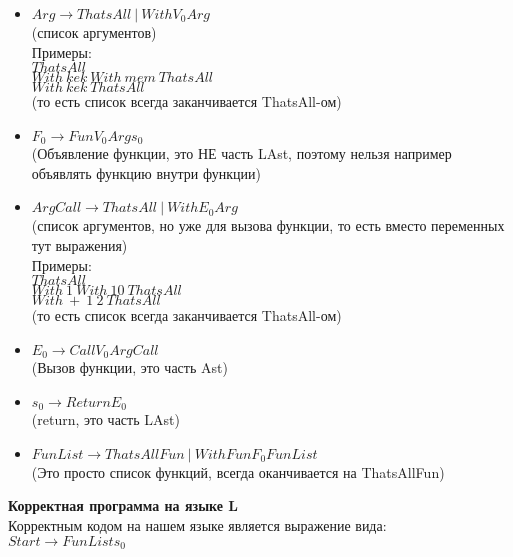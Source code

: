 \documentclass[12pt]{article}
\begin{document}
\begin{itemize}
	\item $Arg \to ThatsAll \ | \ With $\textvisiblespace$ V_0 $\textvisiblespace$ Arg$ \\ (список аргументов) \\
	Примеры: \\ 
	$ThatsAll$ \\
	$With \ kek \ With \ mem \ ThatsAll$ \\
	$With \ kek \ ThatsAll$ \\
	(то есть список всегда заканчивается ThatsAll-ом)
	
	\item $F_0 \to Fun $\textvisiblespace$  V_0 $\textvisiblespace$ Arg $\textvisiblespace$ s_0$ \\
	(Объявление функции, это НЕ часть LAst, поэтому нельзя например объявлять функцию внутри функции) \\



	\item $ArgCall \to ThatsAll \ | \ With $\textvisiblespace$ E_0 $\textvisiblespace$ Arg$ \\ (список аргументов, но уже для вызова функции, то есть вместо переменных тут выражения) \\
	Примеры: \\ 
	$ThatsAll$ \\
	$With \ 1 \ With \ 10 \ ThatsAll$ \\
	$With \ + \ 1 \ 2 \ ThatsAll$ \\
	(то есть список всегда заканчивается ThatsAll-ом)
	
	\item $E_0 \to Call $\textvisiblespace$  V_0 $\textvisiblespace$ ArgCall$ \\
	(Вызов функции, это часть Ast) \\
	
	
	
	\item $s_0 \to Return $\textvisiblespace$ E_0 $ \\
	(return, это часть LAst) \\
	
	
	\item $FunList \to ThatsAllFun \ | \ WithFun $\textvisiblespace$ F_0 $\textvisiblespace$ FunList$ \\
	(Это просто список функций, всегда оканчивается на ThatsAllFun) \\
		
\end{itemize}

\textbf{Корректная программа на языке L} \\
Корректным кодом на нашем языке является выражение вида: \\
$Start \to FunList  $\textvisiblespace$ s_0$
\end{document}
